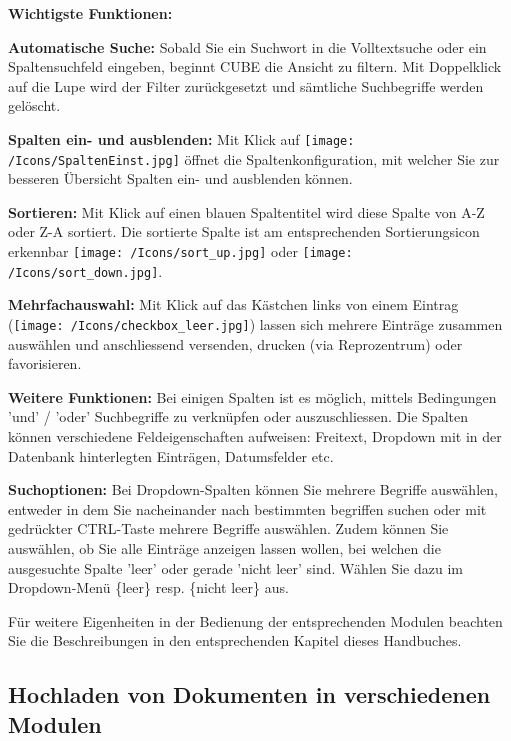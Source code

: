 \textbf{Wichtigste Funktionen:}

\vspace{\baselineskip}

\begin{compactitem}
	\item \textbf{Automatische Suche:} Sobald Sie ein Suchwort in die Volltextsuche oder ein Spaltensuchfeld eingeben, beginnt CUBE die Ansicht zu filtern. Mit Doppelklick auf die Lupe wird der Filter zurückgesetzt und sämtliche Suchbegriffe werden gelöscht.
	\item \textbf{Spalten ein- und ausblenden:} Mit Klick auf \texttt{[image: /Icons/SpaltenEinst.jpg]} öffnet die Spaltenkonfiguration, mit welcher Sie zur besseren Übersicht Spalten ein- und ausblenden können.
	\item \textbf{Sortieren:} Mit Klick auf einen blauen Spaltentitel wird diese Spalte von A-Z oder Z-A sortiert. Die sortierte Spalte ist am entsprechenden Sortierungsicon erkennbar \texttt{[image: /Icons/sort\_up.jpg]} oder \texttt{[image: /Icons/sort\_down.jpg]}.
		\item \textbf{Mehrfachauswahl:} Mit Klick auf das Kästchen links von einem Eintrag (\texttt{[image: /Icons/checkbox\_leer.jpg]}) lassen sich mehrere Einträge zusammen auswählen und anschliessend versenden, drucken (via Reprozentrum) oder favorisieren.
	\item \textbf{Weitere Funktionen:} Bei einigen Spalten ist es möglich, mittels Bedingungen 'und' / 'oder' Suchbegriffe zu verknüpfen oder auszuschliessen. Die Spalten können verschiedene Feldeigenschaften aufweisen: Freitext, Dropdown mit in der Datenbank hinterlegten Einträgen, Datumsfelder etc.
	\item \textbf{Suchoptionen:} Bei Dropdown-Spalten können Sie mehrere Begriffe auswählen, entweder in dem Sie nacheinander nach bestimmten begriffen suchen oder mit gedrückter CTRL-Taste mehrere Begriffe auswählen. Zudem können Sie auswählen, ob Sie alle Einträge anzeigen lassen wollen, bei welchen die ausgesuchte Spalte 'leer' oder gerade 'nicht leer' sind. Wählen Sie dazu im Dropdown-Menü \{leer\} resp. \{nicht leer\} aus. 
\end{compactitem}	

\vspace{\baselineskip}

Für weitere Eigenheiten in der Bedienung der entsprechenden Modulen beachten Sie die Beschreibungen in den entsprechenden Kapitel dieses Handbuches.

\subsection{Hochladen von Dokumenten in verschiedenen Modulen}

